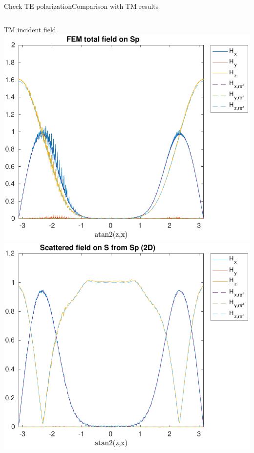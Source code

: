 \begin{frame}[allowframebreaks]{Check TE polarization}{Comparison
      with TM results}
    \begin{columns}
      \hfill TM incident field \hfill\mbox{}
      \vspace{1ex}
      \includegraphics[width=\linewidth]{results/TM/H_Sp.pdf}
      \includegraphics[width=\linewidth]{results/TM/H_S.pdf}
      

\end{columns}
\end{frame}
